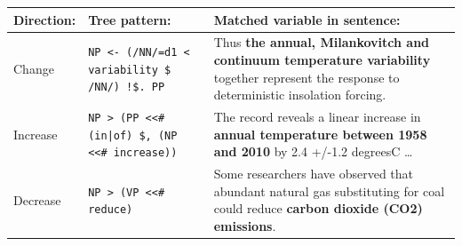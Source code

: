 \documentclass[24pt, a0papper, portrait]{tikzposter}
\begin{document}
{
\begin{tabular*}{\linewidth}{l p{25cm} p{47cm}}
\toprule

\textbf{Direction}: & \textbf{Tree pattern:} & \textbf{Matched variable in sentence:} \\

\midrule

Change   & 
\texttt{NP <- (/NN/=d1 < variability \$ /NN/) !\$. PP} &
Thus \textbf{the annual, Milankovitch and continuum temperature variability} together represent the response to deterministic insolation forcing. \\

\midrule

Increase & 
\texttt{NP > (PP <\-<\# (in|of) \$, (NP <\-<\# increase))} & 
The record reveals a linear increase in \textbf{annual temperature between 1958 and 2010} by 2.4 +/-1.2 degreesC \ldots \\
\midrule

Decrease  & 
\texttt{NP > (VP <\-<\# reduce)}  &
Some researchers have observed that abundant natural gas substituting for coal could reduce \textbf{carbon dioxide (CO2) emissions}.  \\

\bottomrule
\end{tabular*}    

\vspace{2.5cm}
}



\end{document}
